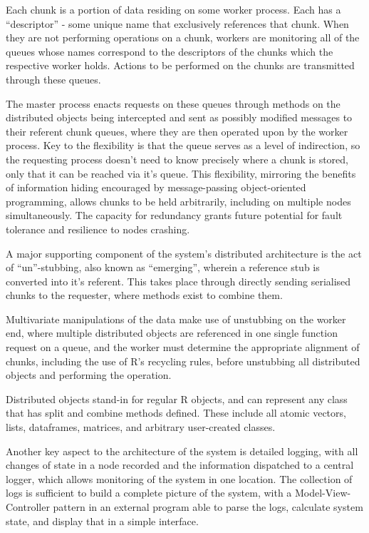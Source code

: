 Each chunk is a portion of data residing on some worker process.
Each has a ``descriptor'' - some unique name that exclusively references that chunk.
When they are not performing operations on a chunk, workers are monitoring all of the queues whose names correspond to the descriptors of the chunks which the respective worker holds.
Actions to be performed on the chunks are transmitted through these queues.

The master process enacts requests on these queues through methods on the distributed objects being intercepted and sent as possibly modified messages to their referent chunk queues, where they are then operated upon by the worker process.
Key to the flexibility is that the queue serves as a level of indirection, so the requesting process doesn't need to know precisely where a chunk is stored, only that it can be reached via it's queue.
This flexibility, mirroring the benefits of information hiding encouraged by message-passing object-oriented programming, allows chunks to be held arbitrarily, including on multiple nodes simultaneously.
The capacity for redundancy grants future potential for fault tolerance and resilience to nodes crashing.

A major supporting component of the system's distributed architecture is the act of ``un''-stubbing, also known as ``emerging'', wherein a reference stub is converted into it's referent.
This takes place through directly sending serialised chunks to the requester, where methods exist to combine them.

Multivariate manipulations of the data make use of unstubbing on the worker end, where multiple distributed objects are referenced in one single function request on a queue, and the worker must determine the appropriate alignment of chunks, including the use of R's recycling rules, before unstubbing all distributed objects and performing the operation.

Distributed objects stand-in for regular R objects, and can represent any class that has split and combine methods defined.
These include all atomic vectors, lists, dataframes, matrices, and arbitrary user-created classes.

Another key aspect to the architecture of the system is detailed logging, with all changes of state in a node recorded and the information dispatched to a central logger, which allows monitoring of the system in one location. The collection of logs is sufficient to build a complete picture of the system, with a Model-View-Controller pattern in an external program able to parse the logs, calculate system state, and display that in a simple interface.

